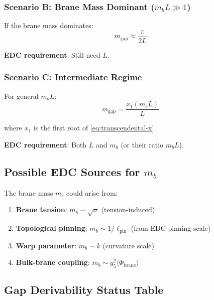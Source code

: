 \documentclass[11pt,a4paper]{article}
\newcommand{\mgap}{m_{\mathrm{gap}}}
\newcommand{\mb}{m_b}
\theoremstyle{definition}
\theoremstyle{plain}
\theoremstyle{remark}
\begin{document}
\subsubsection{Scenario B: Brane Mass Dominant ($\mb L \gg 1$)}

If the brane mass dominates:
\begin{equation}
\mgap \approx \frac{\pi}{2L}
\label{eq:scenario-b}
\end{equation}

\textbf{EDC requirement}: Still need $L$.

\subsubsection{Scenario C: Intermediate Regime}

For general $\mb L$:
\begin{equation}
\mgap = \frac{x_1(\mb L)}{L}
\label{eq:scenario-c}
\end{equation}

where $x_1$ is the first root of \cref{eq:transcendental-x}.

\textbf{EDC requirement}: Both $L$ and $\mb$ (or their ratio $\mb L$).

\subsection{Possible EDC Sources for $\mb$}

The brane mass $\mb$ could arise from:

\begin{enumerate}
\item \textbf{Brane tension}: $\mb \sim \sqrt{\sigma}$ (tension-induced)
\item \textbf{Topological pinning}: $\mb \sim 1/\ell_{\mathrm{pin}}$ (from EDC pinning scale)
\item \textbf{Warp parameter}: $\mb \sim k$ (curvature scale)
\item \textbf{Bulk-brane coupling}: $\mb \sim g_5^2 \langle\Phi_{\mathrm{brane}}\rangle$
\end{enumerate}

\subsection{Gap Derivability Status Table}
\end{document}
